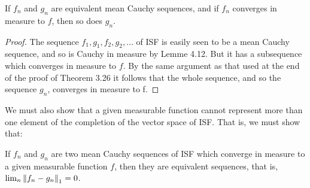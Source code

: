 \begin{lemma}
If $f_n$ and $g_n$ are equivalent mean Cauchy sequences, and if $f_n$ converges in measure to $f$, then so does $g_n$.
\end{lemma}

\begin{proof}
The sequence $f_1,g_1,f_2,g_2,\dots$ of ISF is easily seen to be a mean Cauchy sequence, and so is Cauchy in measure by Lemme 4.12. But it has a subsequence which converges in measure to $f$. By the same argument as that used at the end of the proof of Theorem 3.26 it follows that the whole sequence, and so the sequence $g_n$, converges in measure to f.
\end{proof}

We must also show that a given measurable function cannot represent more than one element of the completion of the vector space of ISF. That is, we must show that:

\begin{lemma}
If $f_n$ and $g_n$ are two mean Cauchy sequences of ISF which converge in measure to a given measurable function $f$, then they are equivalent sequences, that is, $\lim_n\norm{f_n-g_n}_1=0$.
\end{lemma}

